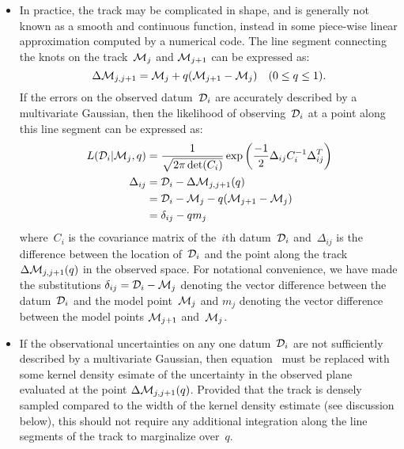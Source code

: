\documentclass[ms.tex]{subfiles}
\begin{document}
\begin{itemize}
	\item In practice, the track may be complicated in shape, and is generally
	not known as a smooth and continuous function, instead in some piece-wise
	linear approximation computed by a numerical code.
	The line segment connecting the knots on the track~$\mathcal{M}_j$ and
	$\mathcal{M}_{j + 1}$ can be expressed as:
	\begin{equation}
	\Delta\mathcal{M}_{j,j + 1} = \mathcal{M}_j + q(\mathcal{M}_{j + 1} -
	\mathcal{M}_j) \quad (0 \leq q \leq 1).
	\end{equation}
	If the errors on the observed datum~$\mathcal{D}_i$ are accurately described
	by a multivariate Gaussian, then the likelihood of observing~$\mathcal{D}_i$
	at a point along this line segment can be expressed as:
	\begin{subequations}\begin{align}
	L(\mathcal{D}_i | \mathcal{M}_j, q) &=
	\label{eq:l_di_mj_q}
	\frac{1}{\sqrt{2\pi \det(C_i)}}
	\exp\left(\frac{-1}{2}\Delta_{ij} C_{i}^{-1} \Delta_{ij}^T\right)
	\\
	\Delta_{ij} &= \mathcal{D}_i - \Delta\mathcal{M}_{j,j + 1}(q)
	\\
	&= \mathcal{D}_i - \mathcal{M}_j - q(\mathcal{M}_{j + 1} - \mathcal{M}_j)
	\label{eq:delta_segment}
	\\
	&= \delta_{ij} - q m_j
	\end{align}\end{subequations}
	where~$C_i$ is the covariance matrix of the~$i$th datum~$\mathcal{D}_i$
	and~$\Delta_{ij}$ is the difference between the location of~$\mathcal{D}_i$
	and the point along the track~$\Delta\mathcal{M}_{j,j + 1}(q)$ in the
	observed space.
	For notational convenience, we have made the substitutions
	$\delta_{ij} = \mathcal{D}_i - \mathcal{M}_j$ denoting the vector difference
	between the datum~$\mathcal{D}_i$ and the model point~$\mathcal{M}_j$ and
	$m_j$ denoting the vector difference between the model points
	$\mathcal{M}_{j + 1}$ and~$\mathcal{M}_j$.

	\item If the observational uncertainties on any one datum~$\mathcal{D}_i$
	are not sufficiently described by a multivariate Gaussian, then
	equation~ must be replaced with some kernel density
	esimate of the uncertainty in the observed plane evaluated at the point
	$\Delta \mathcal{M}_{j,j + 1}(q)$.
	Provided that the track is densely sampled compared to the width of the
	kernel density estimate (see discussion below), this should not require
	any additional integration along the line segments of the track to
	marginalize over~$q$.


\end{itemize}
\end{document}
